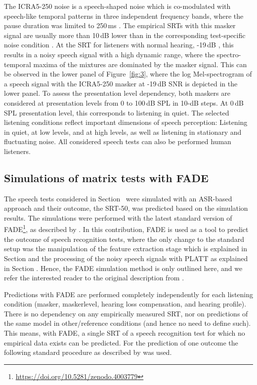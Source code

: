 \documentclass[10pt,a4paper,twocolumn]{article}
\begin{document}
%
The ICRA5-250 noise is a speech-shaped noise which is co-modulated with speech-like temporal patterns in three independent frequency bands, where the pause duration was limited to 250\,ms \citep{wagener2006}.
%
The empirical SRTs with this masker signal are usually more than 10\,dB lower than in the corresponding test-specific noise condition \citep{hochmuth2015}.
%
At the SRT for listeners with normal hearing, -19\,dB \citep{hochmuth2015}, this results in a noisy speech signal with a high dynamic range, where the spectro-temporal maxima of the mixtures are dominated by the masker signal.
%
This can be observed in the lower panel of Figure~\ref{fig:3}, where the log Mel-spectrogram of a speech signal with the ICRA5-250 masker at -19\,dB SNR is depicted in the lower panel.
%
To assess the presentation level dependency, both maskers are considered at presentation levels from 0 to 100\,dB SPL in 10-dB steps.
%
At 0\,dB SPL presentation level, this corresponds to listening in quiet.
%
The selected listening conditions reflect important dimensions of speech perception: Listening in quiet, at low levels, and at high levels, as well as listening in stationary and fluctuating noise.
%
All considered speech tests can also be performed human listeners.

\subsection*{Simulations of matrix tests with FADE}
\label{sec:fade}
%
The speech tests considered in Section~ were simulated with an ASR-based approach and their outcome, the SRT-50, was predicted based on the simulation results.
%
The simulations were performed with the latest standard version of FADE\footnote{\url{https://doi.org/10.5281/zenodo.4003779}}, as described by \cite{schaedler2016a}.
%
In this contribution, FADE is used as a tool to predict the outcome of speech recognition tests, where the only change to the standard setup was the manipulation of the feature extraction stage which is explained in Section  and the processing of the noisy speech signals with PLATT as explained in Section .
%
Hence, the FADE simulation method is only outlined here, and we refer the interested reader to the original description from \cite{schaedler2016a}.

Predictions with FADE are performed completely independently for each listening condition (masker, maskerlevel, hearing loss compensation, and hearing profile).
%
There is no dependency on any empirically measured SRT, nor on predictions of the same model in other/reference conditions (and hence no need to define such).
%
This means, with FADE, a single SRT of a speech recognition test for which no empirical data exists can be predicted.
%
For the prediction of one outcome the following standard procedure as described by \cite{schaedler2016a} was used.
\end{document}
